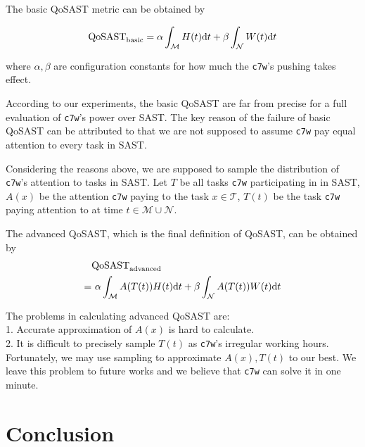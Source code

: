 \documentclass[10pt,twocolumn,letterpaper]{article}
\begin{document}
The basic QoSAST metric can be obtained by

\begin{equation}
{\rm QoSAST}_{\rm basic} = \alpha\int_\mathcal{M} H(t) {\rm d}t + \beta\int_\mathcal{N} W(t
) {\rm d}t
\end{equation}

where $\alpha, \beta$ are configuration constants for how much the \verb|c7w|'s pushing takes effect.

According to our experiments, the basic QoSAST are far from precise for a full evaluation of \verb|c7w|'s power over SAST. The key reason of the failure of basic QoSAST can be attributed to that we are not supposed to assume \verb|c7w| pay equal attention to every task in SAST.

Considering the reasons above, we are supposed to sample the distribution of \verb|c7w|'s attention to tasks in SAST. Let $T$ be all tasks \verb|c7w| participating in in SAST, $A(x)$ be the attention \verb|c7w| paying to the task $x \in \mathcal{T}$, $T(t)$ be the task \verb|c7w| paying attention to at time $t \in \mathcal{M} \cup \mathcal{N}$.

The advanced QoSAST, which is the final definition of QoSAST, can be obtained by
\begin{equation}
    \begin{aligned}
    &{\rm QoSAST}_{\rm advanced}\\
    =& \ \alpha\int_\mathcal{M} A(T(t))H(t) {\rm d}t + \beta\int_\mathcal{N} A(T(t))W(t) {\rm d}t
\end{aligned}
\end{equation}


The problems in calculating advanced QoSAST are: \\
1. Accurate approximation of $A(x)$ is hard to calculate. \\
2. It is difficult to precisely sample $T(t)$ as \verb|c7w|'s irregular working hours. \\

Fortunately, we may use sampling to approximate $A(x), T(t)$ to our best. We leave this problem to future works and we believe that \verb|c7w| can solve it in one minute.


\section{Conclusion}
\end{document}
